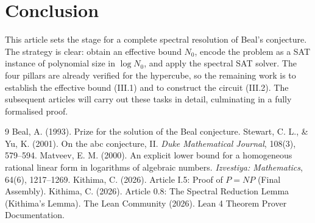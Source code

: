 \documentclass[11pt,a4paper]{article}
\begin{document}
\section{Conclusion}

This article sets the stage for a complete spectral resolution of Beal's conjecture. The strategy is clear: obtain an effective bound \(N_0\), encode the problem as a SAT instance of polynomial size in \(\log N_0\), and apply the spectral SAT solver. The four pillars are already verified for the hypercube, so the remaining work is to establish the effective bound (III.1) and to construct the circuit (III.2). The subsequent articles will carry out these tasks in detail, culminating in a fully formalised proof.


\begin{thebibliography}{9}
  Beal, A. (1993). Prize for the solution of the Beal conjecture.
  Stewart, C. L., \& Yu, K. (2001). On the abc conjecture, II. \emph{Duke Mathematical Journal}, 108(3), 579–594.
  Matveev, E. M. (2000). An explicit lower bound for a homogeneous rational linear form in logarithms of algebraic numbers. \emph{Izvestiya: Mathematics}, 64(6), 1217–1269.
  Kithima, C. (2026). Article I.5: Proof of \(P = NP\) (Final Assembly).
  Kithima, C. (2026). Article 0.8: The Spectral Reduction Lemma (Kithima's Lemma).
  The Lean Community (2026). Lean 4 Theorem Prover Documentation.
\end{thebibliography}
\end{document}
